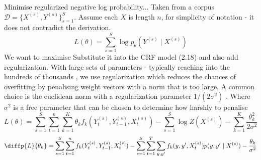\documentclass[../main.tex]{subfiles}
\begin{document}
Minimise regularized negative log probability...
Taken from a corpus $\mathcal{D} = \{X^{(s)}, Y^{(s)}\}_{s=1}^S$. Assume each $X$ is length $n$, for simplicity of notation - it does not contradict the derivation. 
\begin{equation*}
    L(\theta) = \sum_{s=1}^S \log p_\theta(Y^{(s)} \mid X^{(s)})
\end{equation*}
We want to maximise
Substitute it into the CRF model (2.18) and also add regularization.
With large sets of parameters - typically reaching into the hundreds of thousands , we use regularization which reduces the chances of overfitting by penalising weight vectors with a norm that is too large. A common choice is the euclidean norm with a regularization parameter $1/(2\sigma^2)$ \autocite{sutton-2012-crfintro}. Where $\sigma^2$ is a free parameter that can be chosen to determine how harshly to penalise %
\begin{equation*}
    L(\theta) = \sum_{s=1}^S \sum_{t=1}^n \sum_{k=1}^K \theta_k f_k(Y_t^{(s)}, Y_{t-1}^{(s)}, X_t^{(s)}) - \sum_{s=1}^S \log Z(X^{(s)}) - \sum_{k=1}^K \frac{\theta_k^2}{2\sigma^2}
\end{equation*}
\begin{equation*}
    \diffp{L}{{\theta_k}} = \sum_{s=1}^S  \sum_{t=1}^n f_k(Y_t^{(s)}, Y_{t-1}^{(s)}, X_t^{(s)}) - \sum_{s=1}^S \sum_{t=1}^T \sum_{y,y'} f_k(y,y',X_t^{(s)})p(y,y'\mid X^{(s)}) - \frac{\theta_k}{\sigma^2} 
\end{equation*}

\end{document}
